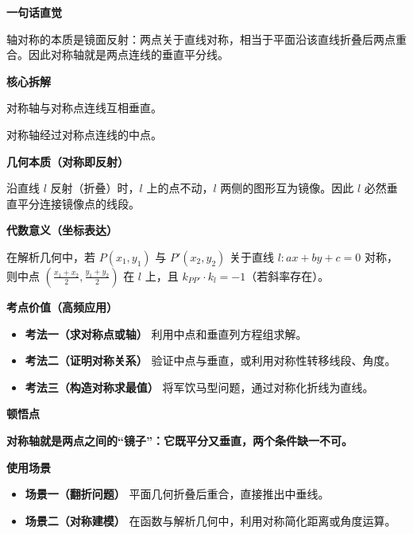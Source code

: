 \begin{explanationbox}
	\textbf{\textcolor{CExplanation}{一句话直觉}}

	轴对称的本质是镜面反射：两点关于直线对称，相当于平面沿该直线折叠后两点重合。因此对称轴就是两点连线的垂直平分线。

	\medskip
	\textbf{\textcolor{CExplanation}{核心拆解}}
	\begin{description}[style=nextline, leftmargin=2.8em, labelsep=0.5em, itemsep=0.45em]
		\item[\textbf{要点一（垂直关系）}] 对称轴与对称点连线互相垂直。
		\item[\textbf{要点二（中点关系）}] 对称轴经过对称点连线的中点。
	\end{description}

	\medskip
	\textbf{\textcolor{CExplanation}{几何本质（对称即反射）}}

	沿直线 $l$ 反射（折叠）时，$l$ 上的点不动，$l$ 两侧的图形互为镜像。因此 $l$ 必然垂直平分连接镜像点的线段。

	\medskip
	\textbf{\textcolor{CExplanation}{代数意义（坐标表达）}}

	在解析几何中，若 $P(x_1,y_1)$ 与 $P'(x_2,y_2)$ 关于直线 $l: ax+by+c=0$ 对称，则中点 $\left(\frac{x_1+x_2}{2},\frac{y_1+y_2}{2}\right)$ 在 $l$ 上，且 $k_{PP'}\cdot k_l = -1$（若斜率存在）。

	\medskip
	\textbf{\textcolor{CExplanation}{考点价值（高频应用）}}
	\begin{itemize}[leftmargin=*, itemsep=0.5em, topsep=0.4em]
		\item \textbf{考法一（求对称点或轴）} 利用中点和垂直列方程组求解。
		\item \textbf{考法二（证明对称关系）} 验证中点与垂直，或利用对称性转移线段、角度。
		\item \textbf{考法三（构造对称求最值）} 将军饮马型问题，通过对称化折线为直线。
	\end{itemize}

	\medskip
	\textbf{\textcolor{CExplanation}{顿悟点}}

	\textbf{对称轴就是两点之间的“镜子”：它既平分又垂直，两个条件缺一不可。}

	\medskip
	\textbf{\textcolor{CExplanation}{使用场景}}
	\begin{itemize}[leftmargin=*, itemsep=0.5em, topsep=0.4em]
		\item \textbf{场景一（翻折问题）} 平面几何折叠后重合，直接推出中垂线。
		\item \textbf{场景二（对称建模）} 在函数与解析几何中，利用对称简化距离或角度运算。
	\end{itemize}
\end{explanationbox}

